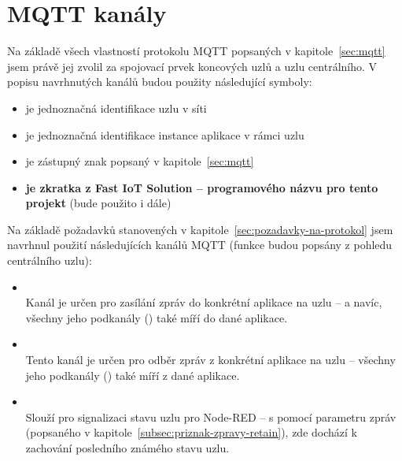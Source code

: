 \section{MQTT kanály}\label{sec:mqtt-kanaly}
Na základě všech vlastností protokolu MQTT popsaných v kapitole~\ref{sec:mqtt} jsem právě jej zvolil za spojovací
prvek koncových uzlů a uzlu centrálního.
V popisu navrhnutých kanálů budou použity následující symboly:
\begin{itemize}
    \item {} je jednoznačná identifikace uzlu v síti
    \item {} je jednoznačná identifikace instance aplikace v rámci uzlu
    \item \ic{\#} je zástupný znak popsaný v kapitole~\ref{sec:mqtt}
    \item {} \textbf{je zkratka z Fast IoT Solution -- programového názvu pro tento projekt} (bude použito i dále)
\end{itemize}

Na základě požadavků stanovených v kapitole~\ref{sec:pozadavky-na-protokol} jsem navrhnul použití následujících kanálů
MQTT (funkce budou popsány z pohledu centrálního uzlu):

\begin{itemize}
    \item {} \\
    Kanál je určen pro zasílání zpráv do konkrétní aplikace na uzlu -- a navíc,
    všechny jeho podkanály () také míří do dané aplikace.

    \item {} \\
    Tento kanál je určen pro odběr zpráv z konkrétní aplikace na uzlu --
    všechny jeho podkanály () také míří z dané aplikace.

    \item {} \\
    Slouží pro signalizaci stavu uzlu pro Node-RED -- s pomocí parametru zpráv  (popsaného v
    kapitole~\ref{subsec:priznak-zpravy-retain}), zde dochází k zachování posledního známého stavu uzlu.
\end{itemize}

